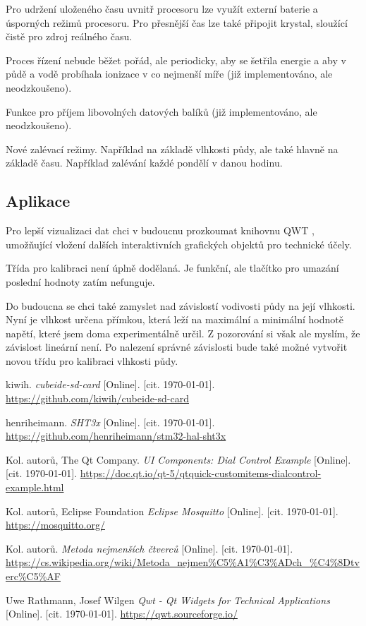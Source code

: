 \documentclass[11pt,a4paper]{article}
\begin{document}
	Pro udržení uloženého času uvnitř procesoru lze využít externí baterie a úsporných režimů procesoru. Pro přesnější čas lze také připojit krystal, sloužící čistě pro zdroj reálného času.

	Proces řízení nebude běžet pořád, ale periodicky, aby se šetřila energie a aby v půdě a vodě probíhala ionizace v co nejmenší míře (již implementováno, ale neodzkoušeno).
	
	Funkce pro příjem libovolných datových balíků (již implementováno, ale neodzkoušeno).
	
	Nové zalévací režimy. Například na základě vlhkosti půdy, ale také hlavně na základě času. Například zalévání každé pondělí v danou hodinu.
	
	
	\subsection{Aplikace}
	Pro lepší vizualizaci dat chci v budoucnu prozkoumat knihovnu QWT \cite{bib:swt}, umožňující vložení dalších interaktivních grafických objektů pro technické účely. 
	
	Třída pro kalibraci není úplně dodělaná. Je funkční, ale tlačítko pro umazání poslední hodnoty zatím nefunguje.
	
	Do budoucna se chci také zamyslet nad závislostí vodivosti půdy na její vlhkosti. Nyní je vlhkost určena přímkou, která leží na maximální a minimální hodnotě napětí, které jsem doma experimentálně určil. Z pozorování si však ale myslím, že závislost lineární není. Po nalezení správné závislosti bude také možné vytvořit novou třídu pro kalibraci vlhkosti půdy.	
	
	
	\begin{thebibliography}{9}
		 kiwih. \emph{cubeide-sd-card} [Online]. [cit. \today]. \newline \url{https://github.com/kiwih/cubeide-sd-card}
			
		 henriheimann. \emph{SHT3x} [Online]. [cit. \today]. \newline \url{https://github.com/henriheimann/stm32-hal-sht3x}
		
		 Kol. autorů, The Qt Company. \emph{UI Components: Dial Control Example} [Online]. [cit. \today]. \newline \url{https://doc.qt.io/qt-5/qtquick-customitems-dialcontrol-example.html}
		
		 Kol. autorů, Eclipse Foundation \emph{Eclipse Mosquitto} [Online]. [cit. \today]. \newline \url{https://mosquitto.org/}	
		
		 Kol. autorů. \emph{Metoda nejmenších čtverců} [Online]. [cit. \today]. \newline \url{		https://cs.wikipedia.org/wiki/Metoda_nejmen%C5%A1%C3%ADch_%C4%8Dtverc%C5%AF}	
		
		 Uwe Rathmann, Josef Wilgen \emph{Qwt - Qt Widgets for Technical Applications} [Online]. [cit. \today]. \newline \url{https://qwt.sourceforge.io/}
		

	\end{thebibliography}
\end{document}
